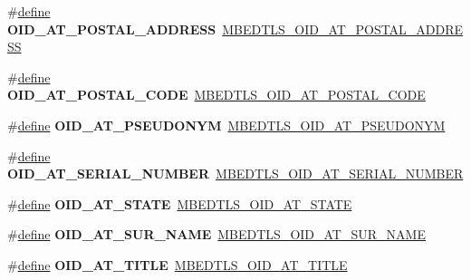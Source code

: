 \begin{DoxyCompactItemize}
\#\hyperlink{structdefine}{define} {\bfseries O\+I\+D\+\_\+\+A\+T\+\_\+\+P\+O\+S\+T\+A\+L\+\_\+\+A\+D\+D\+R\+E\+SS}~\hyperlink{oid_8h_a25ff595205be812b0494c6c8280dd8b5}{M\+B\+E\+D\+T\+L\+S\+\_\+\+O\+I\+D\+\_\+\+A\+T\+\_\+\+P\+O\+S\+T\+A\+L\+\_\+\+A\+D\+D\+R\+E\+SS}
\item 
\mbox{\label{compat-1_83_8h_a67f42ab3f87ccccaa50bd906a2654583}} 
\#\hyperlink{structdefine}{define} {\bfseries O\+I\+D\+\_\+\+A\+T\+\_\+\+P\+O\+S\+T\+A\+L\+\_\+\+C\+O\+DE}~\hyperlink{oid_8h_a69242d2fda38d1cefe38738e660bfc35}{M\+B\+E\+D\+T\+L\+S\+\_\+\+O\+I\+D\+\_\+\+A\+T\+\_\+\+P\+O\+S\+T\+A\+L\+\_\+\+C\+O\+DE}
\item 
\mbox{\label{compat-1_83_8h_a300a121414abf83995d18219ff70682f}} 
\#\hyperlink{structdefine}{define} {\bfseries O\+I\+D\+\_\+\+A\+T\+\_\+\+P\+S\+E\+U\+D\+O\+N\+YM}~\hyperlink{oid_8h_aab2fb77f1c86a04cd4c0be2e7f7f7775}{M\+B\+E\+D\+T\+L\+S\+\_\+\+O\+I\+D\+\_\+\+A\+T\+\_\+\+P\+S\+E\+U\+D\+O\+N\+YM}
\item 
\mbox{\label{compat-1_83_8h_a0492b474aa8361e1f82e2e9028042b3c}} 
\#\hyperlink{structdefine}{define} {\bfseries O\+I\+D\+\_\+\+A\+T\+\_\+\+S\+E\+R\+I\+A\+L\+\_\+\+N\+U\+M\+B\+ER}~\hyperlink{oid_8h_a288608f190ebeeeb0287c026ffa45578}{M\+B\+E\+D\+T\+L\+S\+\_\+\+O\+I\+D\+\_\+\+A\+T\+\_\+\+S\+E\+R\+I\+A\+L\+\_\+\+N\+U\+M\+B\+ER}
\item 
\mbox{\label{compat-1_83_8h_a6d9e7accacbfd7506680251e0c02fc14}} 
\#\hyperlink{structdefine}{define} {\bfseries O\+I\+D\+\_\+\+A\+T\+\_\+\+S\+T\+A\+TE}~\hyperlink{oid_8h_a84965b3da3240d7189d78cb00d92a569}{M\+B\+E\+D\+T\+L\+S\+\_\+\+O\+I\+D\+\_\+\+A\+T\+\_\+\+S\+T\+A\+TE}
\item 
\mbox{\label{compat-1_83_8h_a0b6a014152c7db9e089d737f741675f7}} 
\#\hyperlink{structdefine}{define} {\bfseries O\+I\+D\+\_\+\+A\+T\+\_\+\+S\+U\+R\+\_\+\+N\+A\+ME}~\hyperlink{oid_8h_a7d0c477fb4c5c11f34e125792289f928}{M\+B\+E\+D\+T\+L\+S\+\_\+\+O\+I\+D\+\_\+\+A\+T\+\_\+\+S\+U\+R\+\_\+\+N\+A\+ME}
\item 
\mbox{\label{compat-1_83_8h_a41e8aab7109783adf5d2168ad3c6e5b4}} 
\#\hyperlink{structdefine}{define} {\bfseries O\+I\+D\+\_\+\+A\+T\+\_\+\+T\+I\+T\+LE}~\hyperlink{oid_8h_a9b12474db750af2e508618ce69971de2}{M\+B\+E\+D\+T\+L\+S\+\_\+\+O\+I\+D\+\_\+\+A\+T\+\_\+\+T\+I\+T\+LE}

\end{DoxyCompactItemize}

